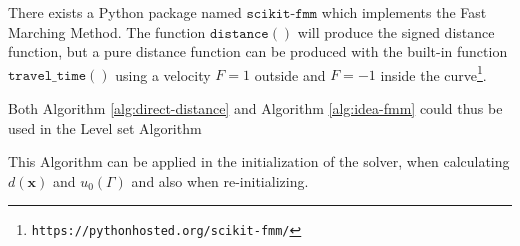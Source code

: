 There exists a Python package named $\texttt{scikit-fmm}$ which implements the Fast Marching Method. The function $\texttt{distance}()$ will produce the signed distance function, but a pure distance function can be produced with the built-in function $\texttt{travel\_time} ()$ using a velocity $F=1$ outside and $F=-1$ inside the curve\footnote{\texttt{https://pythonhosted.org/scikit-fmm/}}.

Both Algorithm \ref{alg:direct-distance} and Algorithm \ref{alg:idea-fmm} could thus be used in the Level set Algorithm

This Algorithm can be applied in the initialization of the solver, when calculating $d(\textbf{x})$ and $u_0(\Gamma)$ and also when re-initializing. 

